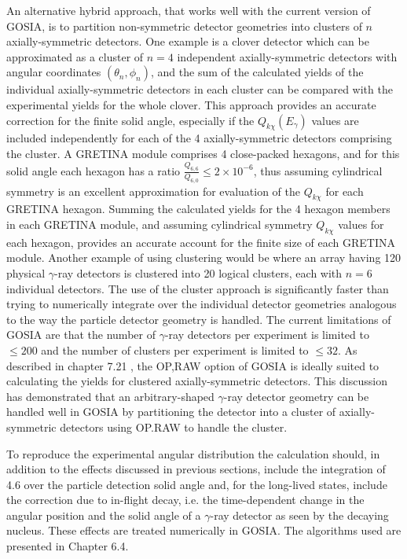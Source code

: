 \documentclass[10pt]{article}
\begin{document}
An alternative hybrid approach, that works well with the current version of GOSIA, is to partition non-symmetric detector geometries into clusters of $n$ axially-symmetric detectors. One example is a clover detector which can be approximated as a cluster of $n=4$ independent axially-symmetric detectors with angular coordinates $\left(\theta_{n}, \phi_{n}\right)$, and the sum of the calculated yields of the individual axially-symmetric detectors in each cluster can be compared with the experimental yields for the whole clover. This approach provides an accurate correction for the finite solid angle, especially if the $Q_{k \chi}\left(E_{\gamma}\right)$ values are included independently for each of the 4 axially-symmetric detectors comprising the cluster. A GRETINA module comprises 4 close-packed hexagons, and for this solid angle each hexagon has a ratio $\frac{Q_{6,6}}{Q_{6,0}} \leq 2 \times 10^{-6}$, thus assuming cylindrical symmetry is an excellent approximation for evaluation of the $Q_{k \chi}$ for each GRETINA hexagon. Summing the calculated yields for the 4 hexagon members in each GRETINA module, and assuming cylindrical symmetry $Q_{k \chi}$ values for each hexagon, provides an accurate account for the finite size of each GRETINA module. Another example of using clustering would be where an array having 120 physical $\gamma$-ray detectors is clustered into 20 logical clusters, each with $n=6$ individual detectors. The use of the cluster approach is significantly faster than trying to numerically integrate over the individual detector geometries analogous to the way the particle detector geometry is handled. The current limitations of GOSIA are that the number of $\gamma$-ray detectors per experiment is limited to $\leq 200$ and the number of clusters per experiment is limited to $\leq 32$. As described in chapter 7.21 , the OP,RAW option of GOSIA is ideally suited to calculating the yields for clustered axially-symmetric detectors. This discussion has demonstrated that an arbitrary-shaped $\gamma$-ray detector geometry can be handled well in GOSIA by partitioning the detector into a cluster of axially-symmetric detectors using OP.RAW to handle the cluster.

To reproduce the experimental angular distribution the calculation should, in addition to the effects discussed in previous sections, include the integration of 4.6 over the particle detection solid angle and, for the long-lived states, include the correction due to in-flight decay, i.e. the time-dependent change in the angular position and the solid angle of a $\gamma$-ray detector as seen by the decaying nucleus. These effects are treated numerically in GOSIA. The algorithms used are presented in Chapter 6.4.
\end{document}
